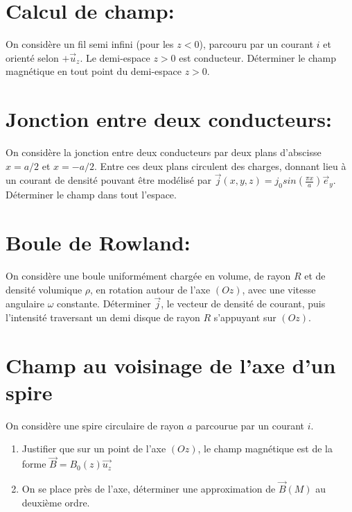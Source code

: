 \documentclass{article}
\begin{document}
\section{Calcul de champ: }


On considère un fil semi infini (pour les $z<0$), parcouru par un courant $i$ et orienté selon $+\vec{u}_z$.
Le demi-espace $z>0$ est conducteur. 
Déterminer le champ magnétique en tout point du demi-espace $z>0$.


\section{Jonction entre deux conducteurs: }

On considère la jonction entre deux conducteurs par deux plans d'abscisse $x=a/2$ et $x=-a/2$.
Entre ces deux plans circulent des charges, donnant lieu à un courant de densité pouvant être modélisé par $\vec{j}(x, y, z) = j_0  sin(\frac{\pi x }{a})\vec{e}_y$.
Déterminer le champ dans tout l'espace. \\[0.1cm]

\section{Boule de Rowland: }
On considère une boule uniformément chargée en volume, de rayon $R$ et de densité volumique $\rho$, en rotation autour de l'axe $(Oz)$, avec une vitesse angulaire $\omega$ constante. 
Déterminer $\vec{j}$, le vecteur de densité de courant, puis l'intensité traversant un demi disque de rayon $R$ s'appuyant sur $(Oz)$. 


\section{Champ au voisinage de l'axe d'un spire}

On considère une spire circulaire de rayon $a$ parcourue par un courant $i$.

\begin{enumerate}
  \item Justifier que sur un point de l'axe $(Oz)$, le champ magnétique est de la forme $\vec{B} = B_0(z) \vec{u_z}$
  \item On se place près de l'axe, déterminer une approximation de $\vec{B}(M)$ au deuxième ordre. 
\end{enumerate}
\end{document}
